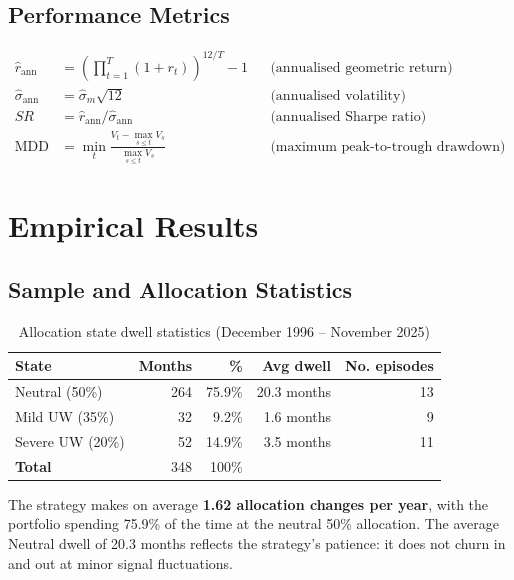 \documentclass[11pt, a4paper]{article}
\begin{document}
\subsection{Performance Metrics}

\begin{align}
  \hat{r}_{\text{ann}} &= \left(\prod_{t=1}^{T}(1+r_t)\right)^{12/T} - 1
  && \text{(annualised geometric return)} \\[4pt]
  \hat{\sigma}_{\text{ann}} &= \hat{\sigma}_m \sqrt{12}
  && \text{(annualised volatility)} \\[4pt]
  SR &= \hat{r}_{\text{ann}} / \hat{\sigma}_{\text{ann}}
  && \text{(annualised Sharpe ratio)} \\[4pt]
  \text{MDD} &= \min_{t}\frac{V_t - \max_{s \leq t} V_s}{\max_{s \leq t} V_s}
  && \text{(maximum peak-to-trough drawdown)}
\end{align}

\section{Empirical Results}
\label{sec:results}

\subsection{Sample and Allocation Statistics}

\begin{table}[H]
\centering
\caption{Allocation state dwell statistics (December 1996 -- November 2025)}
\label{tab:dwell}
\begin{tabular}{lrrrr}
\toprule
\textbf{State} & \textbf{Months} & \textbf{\%} & \textbf{Avg dwell} & \textbf{No. episodes} \\
\midrule
Neutral (50\%)    & 264 & 75.9\% & 20.3 months & 13 \\
Mild UW (35\%)    &  32 &  9.2\% &  1.6 months &  9 \\
Severe UW (20\%)  &  52 & 14.9\% &  3.5 months & 11 \\
\midrule
\textbf{Total}    & 348 & 100\%  & & \\
\bottomrule
\end{tabular}
\end{table}

The strategy makes on average \textbf{1.62 allocation changes per year},
with the portfolio spending 75.9\% of the time at the neutral 50\%
allocation. The average Neutral dwell of 20.3 months reflects the strategy's
patience: it does not churn in and out at minor signal fluctuations.
\end{document}
